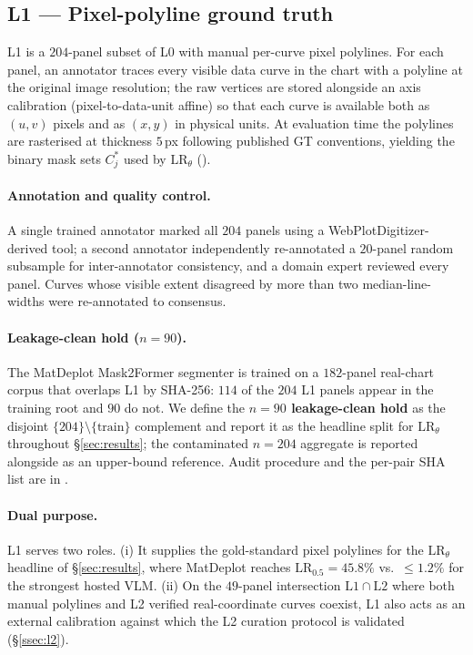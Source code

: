 \documentclass{article}
\begin{document}
\subsection{L1 --- Pixel-polyline ground truth}\label{ssec:l1}
L1 is a $204$-panel subset of L0 with manual per-curve pixel
polylines. For each panel, an annotator traces every visible data
curve in the chart with a polyline at the original image
resolution; the raw vertices are stored alongside an axis
calibration (pixel-to-data-unit affine) so that each curve is
available both as $(u,v)$ pixels and as $(x,y)$ in physical units.
At evaluation time the polylines are rasterised at
thickness $5$\,px following published GT conventions, yielding the
binary mask sets $C^{*}_{j}$ used by $\mathrm{LR}_{\theta}$
().

\paragraph{Annotation and quality control.}
A single trained annotator marked all $204$ panels using a
WebPlotDigitizer-derived tool; a second annotator independently
re-annotated a $20$-panel random subsample for inter-annotator
consistency, and a domain expert reviewed every panel. Curves whose
visible extent disagreed by more than two median-line-widths were
re-annotated to consensus.

\paragraph{Leakage-clean hold ($n{=}90$).}
The MatDeplot Mask2Former segmenter is trained on a $182$-panel
real-chart corpus that overlaps L1 by SHA-256: $114$ of the $204$
L1 panels appear in the training root and $90$ do not. We define
the \textbf{$n{=}90$ leakage-clean hold} as the disjoint
$\{204\}\!\setminus\!\{\text{train}\}$ complement and report it as
the headline split for $\mathrm{LR}_{\theta}$ throughout
\S\ref{sec:results}; the contaminated $n{=}204$ aggregate is
reported alongside as an upper-bound reference. Audit procedure
and the per-pair SHA list are in .

\paragraph{Dual purpose.}
L1 serves two roles. (i) It supplies the gold-standard pixel
polylines for the $\mathrm{LR}_{\theta}$ headline of
\S\ref{sec:results}, where MatDeplot reaches
$\mathrm{LR}_{0.5}{=}45.8\%$ vs.\ ${\leq}1.2\%$ for the strongest
hosted VLM. (ii) On the $49$-panel intersection $\mathrm{L1}\cap
\mathrm{L2}$ where both manual polylines and L2 verified
real-coordinate curves coexist, L1 also acts as an external
calibration against which the L2 curation protocol is validated
(\S\ref{ssec:l2}).
\end{document}

